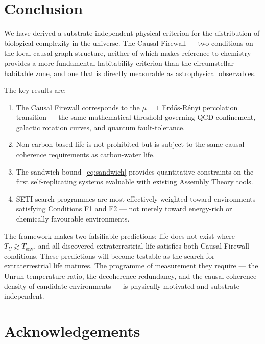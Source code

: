 \documentclass[11pt,a4paper]{article}
\theoremstyle{plain}
\theoremstyle{definition}
\theoremstyle{remark}
\begin{document}
\section{Conclusion}
\label{sec:conclusion}

We have derived a substrate-independent physical criterion for the
distribution of biological complexity in the universe. The Causal Firewall
--- two conditions on the local causal graph structure, neither of which
makes reference to chemistry --- provides a more fundamental habitability
criterion than the circumstellar habitable zone, and one that is directly
measurable as astrophysical observables.

The key results are:
\begin{enumerate}[noitemsep]
  \item The Causal Firewall corresponds to the $\mu = 1$ Erd\H{o}s-R\'{e}nyi
    percolation transition --- the same mathematical threshold governing QCD
    confinement, galactic rotation curves, and quantum fault-tolerance.
  \item Non-carbon-based life is not prohibited but is subject to the same
    causal coherence requirements as carbon-water life.
  \item The sandwich bound~\eqref{eq:sandwich} provides quantitative
    constraints on the first self-replicating systems evaluable with existing
    Assembly Theory tools.
  \item SETI search programmes are most effectively weighted toward environments
    satisfying Conditions F1 and F2 --- not merely toward energy-rich or
    chemically favourable environments.
\end{enumerate}

The framework makes two falsifiable predictions: life does not exist where
$T_U \gtrsim T_{\mathrm{env}}$, and all discovered extraterrestrial life
satisfies both Causal Firewall conditions. These predictions will become
testable as the search for extraterrestrial life matures. The programme of
measurement they require --- the Unruh temperature ratio, the decoherence
redundancy, and the causal coherence density of candidate environments ---
is physically motivated and substrate-independent.

\section*{Acknowledgements}
\end{document}
